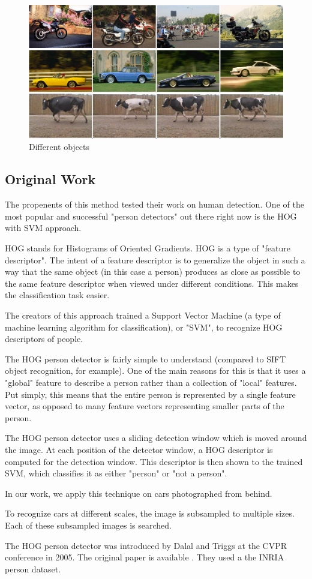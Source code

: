 \begin{figure}[htb]
	\begin{center}
		\includegraphics[scale=0.5]{img/objects.png}
	    \caption{Different objects \label{img:objects}}
    \end{center}
\end{figure}


\subsection{Original Work}

The propenents of this method tested their work on human detection. One of the most popular and successful "person detectors" out there right now is the HOG with SVM approach.

HOG stands for Histograms of Oriented Gradients. HOG is a type of "feature descriptor". The intent of a feature descriptor is to generalize the object in such a way that the same object (in this case a person) produces as close as possible to the same feature descriptor when viewed under different conditions. This makes the classification task easier.

The creators of this approach trained a Support Vector Machine (a type of machine learning algorithm for classification), or "SVM", to recognize HOG descriptors of people.

The HOG person detector is fairly simple to understand (compared to SIFT object recognition, for example). One of the main reasons for this is that it uses a "global" feature to describe a person rather than a collection of "local" features. Put simply, this means that the entire person is represented by a single feature vector, as opposed to many feature vectors representing smaller parts of the person.

The HOG person detector uses a sliding detection window which is moved around the image. At each position of the detector window, a HOG descriptor is computed for the detection window. This descriptor is then shown to the trained SVM, which classifies it as either "person" or "not a person".

In our work, we apply this technique on cars photographed from behind.

To recognize cars at different scales, the image is subsampled to multiple sizes. Each of these subsampled images is searched.

The HOG person detector was introduced by Dalal and Triggs at the CVPR conference in 2005. The original paper is available \cite{Dalal05histogramsof}. They used a the INRIA person dataset.

